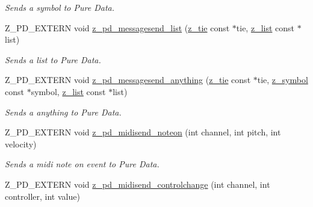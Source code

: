 \begin{DoxyCompactItemize}
\begin{DoxyCompactList}\small\item\em Sends a symbol to Pure Data. \end{DoxyCompactList}\item 
\hypertarget{group__zpd_gad34f8914cd5fd1c02e14dfb344fd99cd}{Z\-\_\-\-P\-D\-\_\-\-E\-X\-T\-E\-R\-N void \hyperlink{group__zpd_gad34f8914cd5fd1c02e14dfb344fd99cd}{z\-\_\-pd\-\_\-messagesend\-\_\-list} (\hyperlink{group__zpd_ga36a59f7502bf6b62bab3e65cc08fe08d}{z\-\_\-tie} const $\ast$tie, \hyperlink{struct__list}{z\-\_\-list} const $\ast$list)}\label{group__zpd_gad34f8914cd5fd1c02e14dfb344fd99cd}

\begin{DoxyCompactList}\small\item\em Sends a list to Pure Data. \end{DoxyCompactList}\item 
\hypertarget{group__zpd_gaa63523869d2801186b6cb884abf6f768}{Z\-\_\-\-P\-D\-\_\-\-E\-X\-T\-E\-R\-N void \hyperlink{group__zpd_gaa63523869d2801186b6cb884abf6f768}{z\-\_\-pd\-\_\-messagesend\-\_\-anything} (\hyperlink{group__zpd_ga36a59f7502bf6b62bab3e65cc08fe08d}{z\-\_\-tie} const $\ast$tie, \hyperlink{group__zpd_ga43e609e9bccc7a2018b8f16558b9494c}{z\-\_\-symbol} const $\ast$symbol, \hyperlink{struct__list}{z\-\_\-list} const $\ast$list)}\label{group__zpd_gaa63523869d2801186b6cb884abf6f768}

\begin{DoxyCompactList}\small\item\em Sends a anything to Pure Data. \end{DoxyCompactList}\item 
\hypertarget{group__zpd_ga1c1e318715a500991cc3a519949666a4}{Z\-\_\-\-P\-D\-\_\-\-E\-X\-T\-E\-R\-N void \hyperlink{group__zpd_ga1c1e318715a500991cc3a519949666a4}{z\-\_\-pd\-\_\-midisend\-\_\-noteon} (int channel, int pitch, int velocity)}\label{group__zpd_ga1c1e318715a500991cc3a519949666a4}

\begin{DoxyCompactList}\small\item\em Sends a midi note on event to Pure Data. \end{DoxyCompactList}\item 
\hypertarget{group__zpd_gaa736126c4fe43e1564578dbec607f6ec}{Z\-\_\-\-P\-D\-\_\-\-E\-X\-T\-E\-R\-N void \hyperlink{group__zpd_gaa736126c4fe43e1564578dbec607f6ec}{z\-\_\-pd\-\_\-midisend\-\_\-controlchange} (int channel, int controller, int value)}\label{group__zpd_gaa736126c4fe43e1564578dbec607f6ec}


\end{DoxyCompactItemize}
